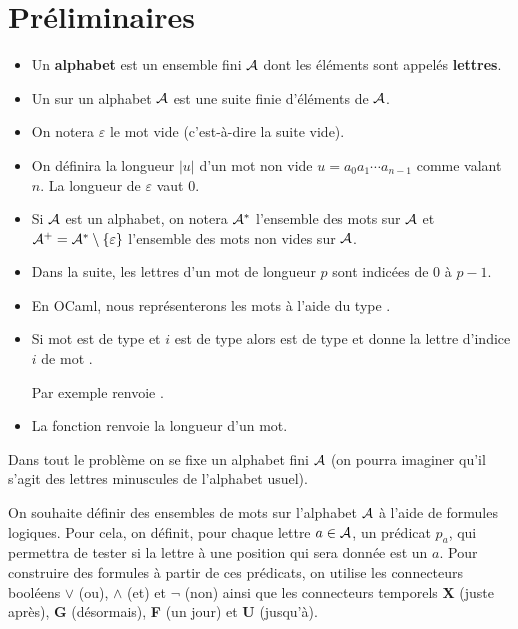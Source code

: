 \section{Préliminaires}
\begin{itemize}
\item Un {\bf alphabet} est un ensemble fini ${\cal A}$ dont les éléments sont appelés {\bf lettres}. 
\item Un {\bf } sur un alphabet ${\cal A}$ est une suite finie d’éléments de ${\cal A}$.
\item On notera $\varepsilon$ le mot vide (c’est-à-dire la suite vide).
\item On définira la longueur $|u|$ d’un mot non vide $u = a_0a_1\cdots a_{n-1}$ comme valant $n$. La longueur de $\varepsilon$ vaut 0.
\item Si ${\cal A}$ est un alphabet, on notera ${\cal A}^*$ l’ensemble des mots sur ${\cal A}$ et ${\cal A}^+={\cal A}^* \setminus \{\varepsilon\}$ l’ensemble des mots non vides sur ${\cal A}$.
\item Dans la suite, les lettres d’un mot de longueur $p$ sont indicées de 0 à $p-1$.
\item En OCaml, nous représenterons les mots à l’aide du type . 
\item Si mot est de type  et $i$ est de type  alors  est de type  et donne la lettre d’indice $i$ de mot . 

Par exemple  renvoie .
\item La fonction  renvoie la longueur d’un mot.
\end{itemize}
Dans tout le problème on se fixe un alphabet fini ${\cal A}$ (on pourra imaginer qu’il s’agit des lettres minuscules de l’alphabet
usuel). 

On souhaite définir des ensembles de mots sur l’alphabet ${\cal A}$ à l’aide de formules logiques. Pour cela, on définit,
pour chaque lettre $a \in {\cal A}$, un prédicat $p_a$, qui permettra de tester si la lettre à une position qui sera donnée est un $a$. Pour construire des formules à partir de ces prédicats, on utilise les connecteurs booléens $\vee$ (ou), $\wedge$ (et) et $\neg$ (non) ainsi que les connecteurs temporels {\bf X} (juste après), {\bf G} (désormais), {\bf F} (un jour) et {\bf U} (jusqu’à).


